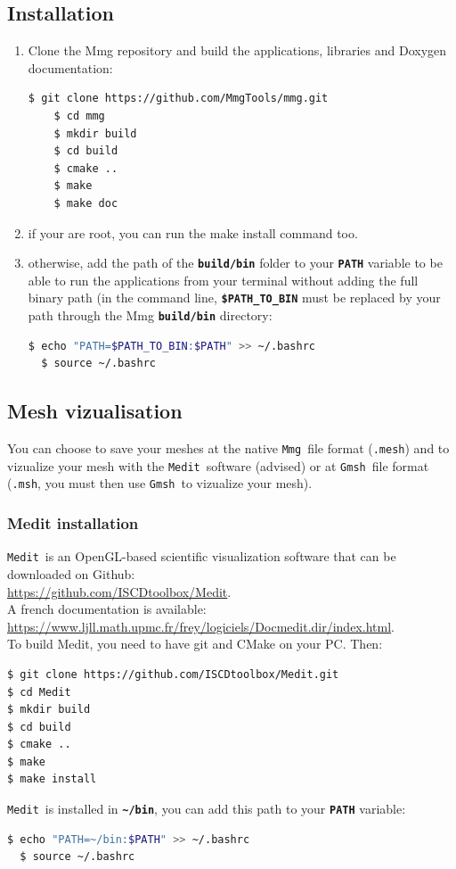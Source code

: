 \documentclass{article}
\newcommand{\ttb}[1]{\texttt{\textbf{#1}}}
\newcommand{\msh}{\texttt{.msh}}
\newcommand{\mesh}{\texttt{.mesh}}
\newcommand{\mmg}{\texttt{Mmg}}
\newcommand{\medit}{\texttt{Medit}}
\newcommand{\gmsh}{\texttt{Gmsh}}
\begin{document}
\subsection{Installation}
\begin{enumerate}
\item Clone the Mmg repository and build the applications, libraries and Doxygen documentation:
  \begin{lstlisting}[language=bash,breaklines=true,breakindent=0pt,columns=fullflexible]
    $ git clone https://github.com/MmgTools/mmg.git
    $ cd mmg
    $ mkdir build
    $ cd build
    $ cmake ..
    $ make
    $ make doc
  \end{lstlisting}
\item if your are root, you can run the make install command too.
\item otherwise, add the path of the \ttb{build/bin} folder to your \ttb{PATH}
  variable to be able to run the applications from your terminal
  without adding the full binary path (in the command line,
  \ttb{\$PATH\_TO\_BIN} must be replaced by your path through the Mmg
  \ttb{build/bin} directory:
\begin{lstlisting}[language=bash]
  $ echo "PATH=$PATH_TO_BIN:$PATH" >> ~/.bashrc
  $ source ~/.bashrc
\end{lstlisting}
\end{enumerate}

\subsection{Mesh vizualisation}
You can choose to save your meshes at the native \mmg\ file format (\mesh) and
to vizualize your mesh with the \medit\ software (advised) or at \gmsh\ file
format (\msh, you must then use \gmsh\ to vizualize your mesh).

\subsubsection{Medit installation}
\medit\ is an OpenGL-based scientific visualization software that can be downloaded on Github:\\
\url{https://github.com/ISCDtoolbox/Medit}.\\ A french documentation is available:\\
\url{https://www.ljll.math.upmc.fr/frey/logiciels/Docmedit.dir/index.html}.\\

To build Medit, you need to have git and CMake on your PC. Then:
\begin{lstlisting}[language=bash]
$ git clone https://github.com/ISCDtoolbox/Medit.git
$ cd Medit
$ mkdir build
$ cd build
$ cmake ..
$ make
$ make install
\end{lstlisting}
\medit\ is installed in \ttb{\textasciitilde/bin}, you can add this path to your \ttb{PATH}
  variable:
\begin{lstlisting}[language=bash]
  $ echo "PATH=~/bin:$PATH" >> ~/.bashrc
  $ source ~/.bashrc

\end{lstlisting}
\end{document}
